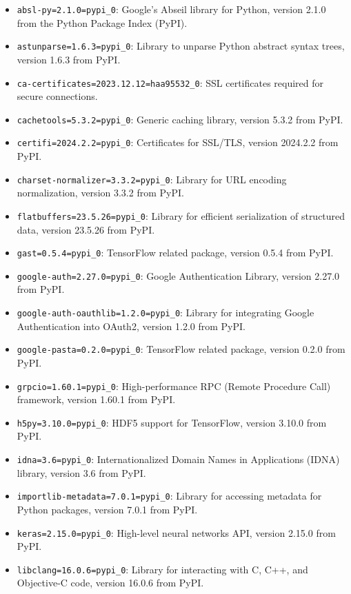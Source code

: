 \begin{itemize}
	\item \texttt{absl-py=2.1.0=pypi\_0}: Google's Abseil library for Python, version 2.1.0 from the Python Package Index (PyPI).
	\item \texttt{astunparse=1.6.3=pypi\_0}: Library to unparse Python abstract syntax trees, version 1.6.3 from PyPI.
	\item \texttt{ca-certificates=2023.12.12=haa95532\_0}: SSL certificates required for secure connections.
	\item \texttt{cachetools=5.3.2=pypi\_0}: Generic caching library, version 5.3.2 from PyPI.
	\item \texttt{certifi=2024.2.2=pypi\_0}: Certificates for SSL/TLS, version 2024.2.2 from PyPI.
	\item \texttt{charset-normalizer=3.3.2=pypi\_0}: Library for URL encoding normalization, version 3.3.2 from PyPI.
	\item \texttt{flatbuffers=23.5.26=pypi\_0}: Library for efficient serialization of structured data, version 23.5.26 from PyPI.
	\item \texttt{gast=0.5.4=pypi\_0}: TensorFlow related package, version 0.5.4 from PyPI.
	\item \texttt{google-auth=2.27.0=pypi\_0}: Google Authentication Library, version 2.27.0 from PyPI.
	\item \texttt{google-auth-oauthlib=1.2.0=pypi\_0}: Library for integrating Google Authentication into OAuth2, version 1.2.0 from PyPI.
	\item \texttt{google-pasta=0.2.0=pypi\_0}: TensorFlow related package, version 0.2.0 from PyPI.
	\item \texttt{grpcio=1.60.1=pypi\_0}: High-performance RPC (Remote Procedure Call) framework, version 1.60.1 from PyPI.
	\item \texttt{h5py=3.10.0=pypi\_0}: HDF5 support for TensorFlow, version 3.10.0 from PyPI.
	\item \texttt{idna=3.6=pypi\_0}: Internationalized Domain Names in Applications (IDNA) library, version 3.6 from PyPI.
	\item \texttt{importlib-metadata=7.0.1=pypi\_0}: Library for accessing metadata for Python packages, version 7.0.1 from PyPI.
	\item \texttt{keras=2.15.0=pypi\_0}: High-level neural networks API, version 2.15.0 from PyPI.
	\item \texttt{libclang=16.0.6=pypi\_0}: Library for interacting with C, C++, and Objective-C code, version 16.0.6 from PyPI.

\end{itemize}
